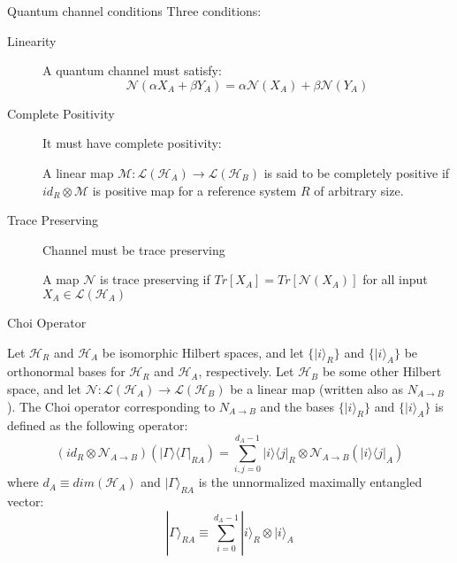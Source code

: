 \begin{frame}{Quantum channel conditions}
    Three conditions:
    \begin{description}
        \item[Linearity] {
            A quantum channel must satisfy:
            \begin{equation}
                \mathcal{N}(\alpha X_A + \beta Y_A) = \alpha \mathcal{N}(X_A) + \beta \mathcal{N}(Y_A)
            \end{equation}
            }
        \item[Complete Positivity] {
            It must have complete positivity:
            \begin{definition}
                A linear map $\mathcal{M} : \mathcal{L}(\mathcal{H}_A) \rightarrow \mathcal{L}(\mathcal{H}_B)$
                is said to be completely positive if $id_R \otimes \mathcal{M}$ is positive map for a reference
                system $R$ of arbitrary size.
            \end{definition}
        }
        \item[Trace Preserving] {
            Channel must be trace preserving
            \begin{definition}
                A map $\mathcal{N}$ is trace preserving if $Tr[X_A] = Tr[\mathcal{N}(X_A)]$ for all input $X_A \in \mathcal{L}(\mathcal{H}_A)$
            \end{definition}
        }
    \end{description}
\end{frame}

\begin{frame}{Choi Operator}
    \begin{definition}
        Let $\mathcal{H}_R$ and $\mathcal{H}_A$ be isomorphic Hilbert spaces, and let
        $\{| i\rangle_R \}$ and $\{|i\rangle_A \}$ be orthonormal bases for $\mathcal{H}_R$
        and $\mathcal{H}_A$, respectively. Let $\mathcal{H}_B$ be some other Hilbert space,
        and let $\mathcal{N} : \mathcal{L}(\mathcal{H}_A) \rightarrow \mathcal{L}(\mathcal{H}_B)$
        be a linear map (written also as $N_{A\rightarrow B}$). The Choi operator corresponding
        to $N_{A\rightarrow B}$ and the bases $\{| i\rangle_R \}$ and $\{|i\rangle_A \}$ is defined
        as the following operator:
        \begin{equation}
            (id_R \otimes \mathcal{N}_{A \rightarrow B})(| \Gamma \rangle\langle \Gamma |_{RA})
            = \displaystyle\sum_{i,j = 0}^{d_A-1}| i \rangle\langle j |_R \otimes \mathcal{N}_{A \rightarrow B}(| i \rangle\langle j |_A)
        \end{equation}
        where $d_A \equiv dim(\mathcal{H}_A)$ and $| \Gamma \rangle_{RA}$ is the unnormalized maximally entangled vector:
        \begin{equation}
            | \Gamma \rangle_{RA} \equiv \displaystyle\sum_{i=0}^{d_A - 1} | i \rangle_R \otimes | i \rangle_A
        \end{equation}
    \end{definition}
\end{frame}

